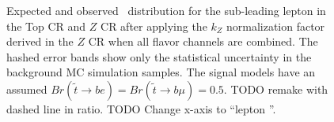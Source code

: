 \begin{figure}
  \centering
  \caption{
    Expected and observed \pt\ distribution for the sub-leading lepton in
    the Top CR and $Z$ CR after applying the $k_Z$ normalization factor derived
    in the $Z$ CR when all flavor channels are combined.
    The hashed error bands show only the statistical uncertainty in the
    background MC simulation samples.
    The signal models have an assumed
    $Br(\tilde{t}\rightarrow be) = Br(\tilde{t}\rightarrow b\mu) = 0.5$.
    {\color{red} TODO remake with dashed line in ratio.}
    {\color{red} TODO Change x-axis to ``lepton \pt''.}
  }
  \label{fig:cr_lep_pt_1__w_norm_factor}
\end{figure}

